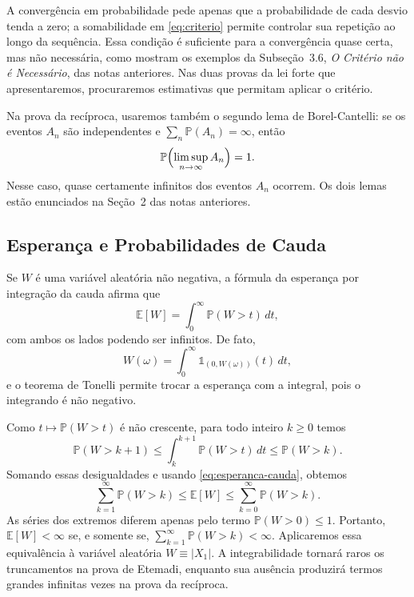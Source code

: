 \documentclass[12pt,portuguese]{article}
\theoremstyle{definition}
\theoremstyle{plainexercise}
\theoremstyle{starredexercise}
\theoremstyle{definition}
\begin{document}
A convergência em probabilidade pede apenas que a probabilidade de cada desvio
tenda a zero; a somabilidade em \eqref{eq:criterio} permite controlar sua
repetição ao longo da sequência. Essa condição é suficiente para a
convergência quase certa, mas não necessária, como mostram os exemplos da
Subseção~3.6, \emph{O Critério não é Necessário}, das notas anteriores. Nas duas
provas da lei forte que apresentaremos, procuraremos estimativas que permitam
aplicar o critério.

Na prova da recíproca, usaremos também o segundo lema de Borel-Cantelli: se os
eventos $A_n$ são independentes e $\sum_n\mathbb{P}(A_n)=\infty$, então
\[
\mathbb{P}\Bigl(\limsup_{n\to\infty}A_n\Bigr)=1.
\]
Nesse caso, quase certamente infinitos dos eventos $A_n$ ocorrem. Os dois
lemas estão enunciados na Seção~2 das notas anteriores.

\subsection{Esperança e Probabilidades de Cauda}\label{subsec:esperanca-cauda}

Se $W$ é uma variável aleatória não negativa, a fórmula da esperança por
integração da cauda afirma que
\begin{equation}\label{eq:esperanca-cauda}
\mathbb{E}[W]=\int_0^{\infty}\mathbb{P}(W>t)\,dt,
\end{equation}
com ambos os lados podendo ser infinitos. De fato,
\[
W(\omega)=\int_0^{\infty}\mathds{1}_{(0,W(\omega))}(t)\,dt,
\]
e o teorema de Tonelli permite trocar a esperança com a integral, pois o
integrando é não negativo.

Como $t\mapsto\mathbb{P}(W>t)$ é não crescente, para todo inteiro $k\geqslant0$
temos
\[
\mathbb{P}(W>k+1)
\leqslant\int_k^{k+1}\mathbb{P}(W>t)\,dt
\leqslant\mathbb{P}(W>k).
\]
Somando essas desigualdades e usando \eqref{eq:esperanca-cauda}, obtemos
\begin{equation}\label{eq:comparacao-cauda}
\sum_{k=1}^{\infty}\mathbb{P}(W>k)
\leqslant\mathbb{E}[W]
\leqslant\sum_{k=0}^{\infty}\mathbb{P}(W>k).
\end{equation}
As séries dos extremos diferem apenas pelo termo $\mathbb{P}(W>0)\leqslant1$.
Portanto, $\mathbb{E}[W]<\infty$ se, e somente se,
$\sum_{k=1}^{\infty}\mathbb{P}(W>k)<\infty$. Aplicaremos essa equivalência à
variável aleatória
$W \equiv |X_1|$. A integrabilidade tornará raros os truncamentos na prova de
Etemadi, enquanto sua ausência produzirá termos grandes infinitas vezes na
prova da recíproca.
\end{document}
